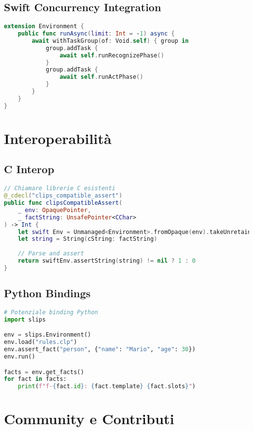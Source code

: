 \subsection{Swift Concurrency Integration}

\begin{lstlisting}[language=Swift]
extension Environment {
    public func runAsync(limit: Int = -1) async {
        await withTaskGroup(of: Void.self) { group in
            group.addTask {
                await self.runRecognizePhase()
            }
            group.addTask {
                await self.runActPhase()
            }
        }
    }
}
\end{lstlisting}

\section{Interoperabilità}

\subsection{C Interop}

\begin{lstlisting}[language=Swift]
// Chiamare librerie C esistenti
@_cdecl("clips_compatible_assert")
public func clipsCompatibleAssert(
    _ env: OpaquePointer,
    _ factString: UnsafePointer<CChar>
) -> Int {
    let swift Env = Unmanaged<Environment>.fromOpaque(env).takeUnretainedValue()
    let string = String(cString: factString)
    
    // Parse and assert
    return swiftEnv.assertString(string) != nil ? 1 : 0
}
\end{lstlisting}

\subsection{Python Bindings}

\begin{lstlisting}[language=Python]
# Potenziale binding Python
import slips

env = slips.Environment()
env.load("rules.clp")
env.assert_fact("person", {"name": "Mario", "age": 30})
env.run()

facts = env.get_facts()
for fact in facts:
    print(f"f-{fact.id}: {fact.template} {fact.slots}")
\end{lstlisting}

\section{Community e Contributi}

